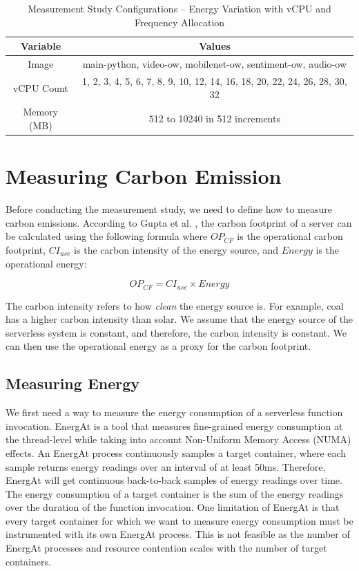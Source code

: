 \documentclass[times, 10pt,twocolumn]{article}
\begin{document}
\begin{table}[htbp]
  \centering
  \begin{tabular}{|c|c|}
  \hline
  \textbf{Variable} & \textbf{Values} \\ \hline
  Image & main-python, video-ow, mobilenet-ow, sentiment-ow, audio-ow \\ \hline
  vCPU Count & 1, 2, 3, 4, 5, 6, 7, 8, 9, 10, 12, 14, 16, 18, 20, 22, 24, 26, 28, 30, 32 \\ \hline
  Memory (MB) & 512 to 10240 in 512 increments\\ \hline
  \end{tabular}
  \caption{Measurement Study Configurations -- Energy Variation with vCPU and Frequency Allocation}
  \label{tab:mstudy1_configurations}
\end{table}

\section{Measuring Carbon Emission}


Before conducting the measurement study, we need to define how to measure carbon emissions. According to Gupta et al. \cite{gupta2022act}, the carbon footprint of a server can be calculated using the following formula where $OP_{CF}$ is the operational carbon footprint, $CI_{use}$ is the carbon intensity of the energy source, and $Energy$ is the operational energy:

\begin{equation}
   OP_{CF} = CI_{use} \times Energy
\end{equation}

The carbon intensity refers to how \textit{clean} the energy source is. For example, coal has a higher carbon intensity than solar. We assume that the energy source of the serverless system is constant, and therefore, the carbon intensity is constant. We can then use the operational energy as a proxy for the carbon footprint.

\subsection{Measuring Energy}
We first need a way to measure the energy consumption of a serverless function invocation. EnergAt \cite{he2023hotcarbon} is a tool that measures fine-grained energy consumption at the thread-level while taking into account Non-Uniform Memory Access (NUMA) effects. An EnergAt process continuously samples a target container, where each sample returns energy readings over an interval of at least 50ms. Therefore, EnergAt will get continuous back-to-back samples of energy readings over time. The energy consumption of a target container is the sum of the energy readings over the duration of the function invocation. One limitation of EnergAt is that every target container for which we want to measure energy consumption must be instrumented with its own EnergAt process. This is not feasible as the number of EnergAt processes and resource contention scales with the number of target containers.
\end{document}
